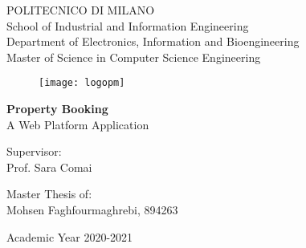 \thispagestyle{empty}
\vspace*{-1.7cm} \bfseries{

\begin{center}
    \normalsize
    POLITECNICO DI MILANO\\
    \small
    School of Industrial and Information Engineering\\
    Department of Electronics, Information and Bioengineering\\
    Master of Science in Computer Science Engineering\\
    \vspace*{0.3cm}
    \begin{figure}[H]
    \begin{center}
        \texttt{[image: logopm]}
    \end{center}
    \end{figure}
    
    \vspace*{0.3cm} \large

    \textbf{Property Booking }\\
    
    \vspace*{.75truecm} \normalsize
    A Web Platform Application
\end{center}



\begin{center}
  \vspace*{2.0cm} \normalsize Supervisor: 
  \\Prof. Sara Comai  
\end{center}
  
  
\begin{center}
    \vspace*{2.0cm} \normalsize Master Thesis of:
    \\Mohsen Faghfourmaghrebi, 894263
\end{center}





\vspace*{1.5cm}

\begin{center}
Academic Year 2020-2021
\end{center} \clearpage
}
\normalfont